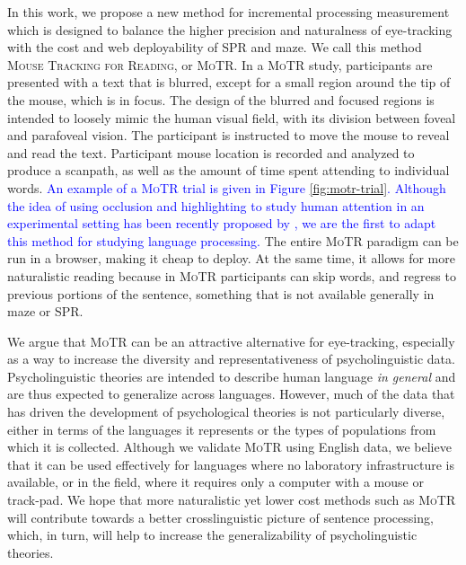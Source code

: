 \documentclass[12pt]{article}
\newcommand{\motr}{\textsc{MoTR}\xspace}
\newcommand{\defn}[1]{\textsc{#1}}
\newcommand{\change}[1]{\textcolor{blue}{#1}}
\begin{document}
In this work, we propose a new method for incremental processing measurement which is designed to balance the higher precision and naturalness of eye-tracking with the cost and web deployability of SPR and maze. We call this method \defn{Mouse Tracking for Reading}, or \motr. In a \motr study, participants are presented with a text that is blurred, except for a small region around the tip of the mouse, which is in focus. The design of the blurred and focused regions is intended to loosely mimic the human visual field, with its division between foveal and parafoveal vision. The participant is instructed to move the mouse to reveal and read the text. Participant mouse location is recorded and analyzed to produce a scanpath, as well as the amount of time spent attending to individual words. \change{An example of a \motr trial is given in Figure \ref{fig:motr-trial}. Although the idea of using occlusion and highlighting to study human attention in an experimental setting has been recently proposed by \citet{anwyl2021mouseview}, we are the first to adapt this method for studying language processing.} The entire \motr paradigm can be run in a browser, making it cheap to deploy. At the same time, it allows for more naturalistic reading because in \motr participants can skip words, and regress to previous portions of the sentence, something that is not available generally in maze or SPR. 

We argue that \motr can be an attractive alternative for eye-tracking, especially as a way to increase the diversity and representativeness of psycholinguistic data. Psycholinguistic theories are intended to describe human language \emph{in general} and are thus expected to generalize across languages. However, much of the data that has driven the development of psychological theories is not particularly diverse, either in terms of the languages it represents or the types of populations from which it is collected. 
Although we validate \motr using English data, we believe that it can be used effectively for languages where no laboratory infrastructure is available, or in the field, where it requires only a computer with a mouse or track-pad. We hope that more naturalistic yet lower cost methods such as \motr will contribute towards a better crosslinguistic picture of sentence processing, which, in turn, will help to increase the generalizability of psycholinguistic theories. 
\end{document}
